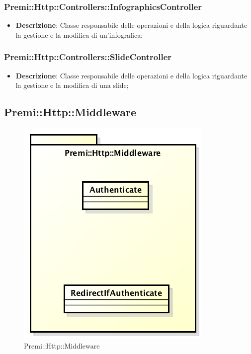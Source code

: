 	\subsubsection*{Premi::Http::Controllers::InfographicsController}
			\begin{itemize}
				\item \textbf{Descrizione}: Classe responsabile delle operazioni e della logica riguardante la gestione e la modifica di un'\gls{infografica};
			\end{itemize}
			
	\subsubsection*{Premi::Http::Controllers::SlideController}
			\begin{itemize}
				\item \textbf{Descrizione}: Classe responsabile delle operazioni e della logica riguardante la gestione e la modifica di una \gls{slide};
			\end{itemize}
		
\newpage
\subsection{Premi::Http::Middleware}
\begin{figure}[h]
\centering
\includegraphics[width=0.7\linewidth]{img/premi_http_middleware}
\caption[Premi::Http::Middleware]{Premi::Http::Middleware}
\label{fig:premi_http_middleware}
\end{figure}

